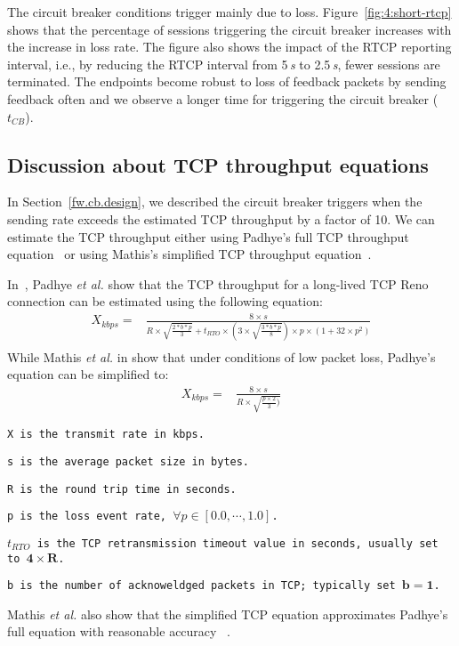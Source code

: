 The circuit breaker conditions trigger mainly due to loss. Figure~\ref{fig:4:short-rtcp} 
shows that the percentage of sessions triggering the circuit breaker
increases with the increase in loss rate. The figure also shows the impact of
the RTCP reporting interval, i.e., by reducing the RTCP interval from 5\,\emph{s} to
2.5\,\emph{s}, fewer sessions are terminated. The endpoints become robust to loss of
feedback packets by sending feedback often and we observe a longer time for
triggering the circuit breaker ($t_{CB}$).

\subsection{Discussion about TCP throughput equations}

In Section~\ref{fw.cb.design}, we described the circuit breaker triggers when
the sending rate exceeds the estimated TCP throughput by a factor of 10. We
can estimate the TCP throughput either using Padhye's full TCP throughput
equation~\cite{padhye1998modeling} or using Mathis's simplified TCP throughput
equation~\cite{mathis1997macroscopic}.

In~\cite{padhye1998modeling}, Padhye \emph{et al.} show that the TCP
throughput for a long-lived TCP Reno connection can be estimated using the
following equation:
\begin{align*}
X_{kbps} = &\frac{8 \times s}{R \times \sqrt{\frac{2*b*p}{3}}+t_{RTO} \times (3 \times \sqrt{\frac{3*b*p}{8}})\times p \times (1+32 \times p^2)}\\
\end{align*}
While Mathis \emph{et al.} in \cite{mathis1997macroscopic} show that under
conditions of low packet loss, Padhye's equation can be simplified to:
\begin{align*}
    X_{kbps} = & \frac{8 \times s}{R \times \sqrt{\frac{p \times 2}{3})}}
\end{align*}
\begin{itemize}
\setlength{\itemsep}{0pt}
{\footnotesize
\item[] \texttt{X is the transmit rate in kbps.}
\item[] \texttt{s is the average packet size in bytes.} 
\item[] \texttt{R is the round trip time in seconds. }
\item[] \texttt{p is the loss event rate, $\forall p \in [0.0, \cdots ,1.0]$.}
\item[] \texttt{$t_{RTO}$ is the TCP retransmission timeout value in seconds, usually set to $\mathbf{4 \times R}$.}
\item[] \texttt{b is the number of acknoweldged packets in TCP; typically set $\mathbf{b=1}$.}
}
\end{itemize}
Mathis \emph{et al.} also show that the simplified TCP equation approximates
Padhye's full equation with reasonable accuracy~\cite{mathis1997macroscopic} .


